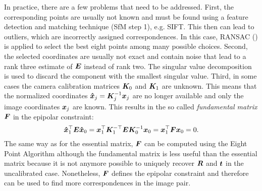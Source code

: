 			In practice, there are a few problems that need to be addressed.
			First, the corresponding points are usually not known and must be found using a feature detection and matching technique (SfM step 1), e.g. SIFT.
			This then can lead to outliers, which are incorrectly assigned correspondences.
			In this case, {RANSAC} (\cite{fischler1981random}) is applied to select the best eight points among many possible choices.
			Second, the selected coordinates are usually not exact and contain noise that lead to a rank three estimate of $\bm{E}$ instead of rank two.
			The singular value decomposition is used to discard the component with the smallest singular value.
			Third, in some cases the camera calibration matrices $\bm{K}_0$ and $\bm{K}_1$ are unknown.
			This means that the normalized coordinates $\bm{\hat{x}}_j = \bm{K}_j^{-1} \bm{x}_j$ are no longer available and only the image coordinates $\bm{x}_j$ are known.
			This results in the so called \emph{fundamental matrix} $\bm{F}$ in the epipolar constraint:
			\begin{equation}\label{eq:fundamental_matrix_epipolar_constraint}
				\bm{\hat{x}}_1^\top \bm{E} \bm{\hat{x}}_0 = 
				\bm{x}_1^\top \bm{K}_1^{-\top} \bm{E} \bm{K}_0^{-1} \bm{x}_0 = 
				\bm{x}_1^\top \bm{F} \bm{x}_0 = 0.
			\end{equation}
			The same way as for the essential matrix, $\bm{F}$ can be computed using the Eight Point Algorithm although the fundamental matrix is less useful than the essential matrix because it is not anymore possible to uniquely recover $\bm{R}$ and $\bm{t}$ in the uncalibrated case.
			Nonetheless, $\bm{F}$ defines the epipolar constraint and therefore can be used to find more correspondences in the image pair.
			
			

			
